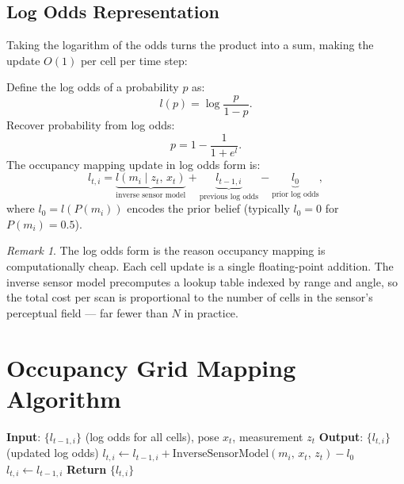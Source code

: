 \documentclass[11pt,a4paper]{article}
\theoremstyle{definition}
\theoremstyle{plain}
\theoremstyle{remark}
\newtheorem*{remark}{Remark}
\begin{document}
\subsection{Log Odds Representation}

Taking the logarithm of the odds turns the product into a sum, making the update $O(1)$ per cell per time step:

\begin{tcolorbox}[colback=blue!5!white,colframe=blue!75!black,title=\textbf{Log Odds Definition and Update}]
Define the log odds of a probability $p$ as:
\[
    l(p) = \log\frac{p}{1-p}.
\]
Recover probability from log odds:
\[
    p = 1 - \frac{1}{1 + e^{l}}.
\]
The occupancy mapping update in log odds form is:
\[
    l_{t,i} = \underbrace{l(m_i \mid z_t,\, x_t)}_{\text{inverse sensor model}} + \underbrace{l_{t-1,i}}_{\text{previous log odds}} - \underbrace{l_0}_{\text{prior log odds}},
\]
where $l_0 = l(P(m_i))$ encodes the prior belief (typically $l_0 = 0$ for $P(m_i) = 0.5$).
\end{tcolorbox}

\begin{remark}
The log odds form is the reason occupancy mapping is computationally cheap. Each cell update is a single floating-point addition. The inverse sensor model precomputes a lookup table indexed by range and angle, so the total cost per scan is proportional to the number of cells in the sensor's perceptual field --- far fewer than $N$ in practice.
\end{remark}

\section{Occupancy Grid Mapping Algorithm}

\begin{algorithm}
\caption{Occupancy Grid Mapping}
\begin{algorithmic}
\STATE \textbf{Input}: $\{l_{t-1,i}\}$ (log odds for all cells), pose $x_t$, measurement $z_t$
\STATE \textbf{Output}: $\{l_{t,i}\}$ (updated log odds)
        \STATE $l_{t,i} \leftarrow l_{t-1,i} + \text{InverseSensorModel}(m_i,\, x_t,\, z_t) - l_0$
    \ELSE
        \STATE $l_{t,i} \leftarrow l_{t-1,i}$
    \ENDIF
\ENDFOR
\STATE \textbf{Return} $\{l_{t,i}\}$
\end{algorithmic}
\end{algorithm}
\end{document}
